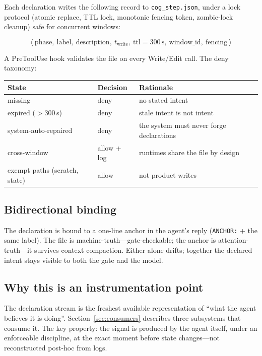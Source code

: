 \documentclass{article}
\begin{document}
Each declaration writes the following record to \texttt{cog\_step.json}, under a lock protocol (atomic replace, TTL lock, monotonic fencing token, zombie-lock cleanup) safe for concurrent windows:

\begin{equation*}
\langle\ \text{phase},\ \text{label},\ \text{description},\ t_{\text{write}},\ \text{ttl}=300\,\mathrm{s},\ \text{window\_id},\ \text{fencing}\ \rangle
\end{equation*}

A PreToolUse hook validates the file on every Write/Edit call. The deny taxonomy:

\begin{center}
\begin{tabular}{lll}
\toprule
State & Decision & Rationale \\
\midrule
missing & deny & no stated intent \\
expired ($>$300\,s) & deny & stale intent is not intent \\
system-auto-repaired & deny & the system must never forge declarations \\
cross-window & allow + log & runtimes share the file by design \\
exempt paths (scratch, state) & allow & not product writes \\
\bottomrule
\end{tabular}
\end{center}

\subsection{Bidirectional binding}

The declaration is bound to a one-line anchor in the agent's reply (\texttt{ANCHOR:} + the same label). The file is machine-truth---gate-checkable; the anchor is attention-truth---it survives context compaction. Either alone drifts; together the declared intent stays visible to both the gate and the model.

\subsection{Why this is an instrumentation point}

The declaration stream is the freshest available representation of ``what the agent believes it is doing''. Section~\ref{sec:consumers} describes three subsystems that consume it. The key property: the signal is produced by the agent itself, under an enforceable discipline, at the exact moment before state changes---not reconstructed post-hoc from logs.
\end{document}
